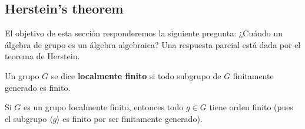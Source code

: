 \begin{exercise}
%
%
%


\section*{Herstein's theorem}

El objetivo de esta sección responderemos la siguiente pregunta: ¿Cuándo un
álgebra de grupo es un álgebra algebraica? Una respuesta parcial está dada por
el teorema de Herstein. 

\begin{definition}
	Un grupo $G$ se dice \textbf{localmente finito} si todo subgrupo de $G$
	finitamente generado es finito.
\end{definition}

Si $G$ es un grupo localmente finito, entonces todo $g\in G$ tiene orden finito
(pues el subgrupo $\langle g\rangle$ es finito por ser finitamente generado). 


\end{exercise}
